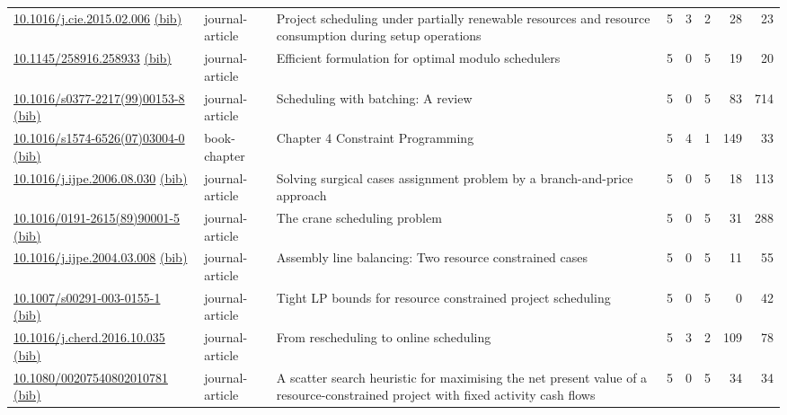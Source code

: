 {\begin{longtable}{p{5cm}lp{11cm}rrrrr}
\href{http://dx.doi.org/10.1016/j.cie.2015.02.006}{10.1016/j.cie.2015.02.006} \href{https://www.doi2bib.org/bib/10.1016/j.cie.2015.02.006}{(bib)} & journal-article & Project scheduling under partially renewable resources and resource consumption during setup operations & 5 & 3 & 2 & 28 & 23 \\
\href{http://dx.doi.org/10.1145/258916.258933}{10.1145/258916.258933} \href{https://www.doi2bib.org/bib/10.1145/258916.258933}{(bib)} & journal-article & Efficient formulation for optimal modulo schedulers & 5 & 0 & 5 & 19 & 20 \\
\href{http://dx.doi.org/10.1016/s0377-2217(99)00153-8}{10.1016/s0377-2217(99)00153-8} \href{https://www.doi2bib.org/bib/10.1016/s0377-2217(99)00153-8}{(bib)} & journal-article & Scheduling with batching: A review & 5 & 0 & 5 & 83 & 714 \\
\href{http://dx.doi.org/10.1016/s1574-6526(07)03004-0}{10.1016/s1574-6526(07)03004-0} \href{https://www.doi2bib.org/bib/10.1016/s1574-6526(07)03004-0}{(bib)} & book-chapter & Chapter 4 Constraint Programming & 5 & 4 & 1 & 149 & 33 \\
\href{http://dx.doi.org/10.1016/j.ijpe.2006.08.030}{10.1016/j.ijpe.2006.08.030} \href{https://www.doi2bib.org/bib/10.1016/j.ijpe.2006.08.030}{(bib)} & journal-article & Solving surgical cases assignment problem by a branch-and-price approach & 5 & 0 & 5 & 18 & 113 \\
\href{http://dx.doi.org/10.1016/0191-2615(89)90001-5}{10.1016/0191-2615(89)90001-5} \href{https://www.doi2bib.org/bib/10.1016/0191-2615(89)90001-5}{(bib)} & journal-article & The crane scheduling problem & 5 & 0 & 5 & 31 & 288 \\
\href{http://dx.doi.org/10.1016/j.ijpe.2004.03.008}{10.1016/j.ijpe.2004.03.008} \href{https://www.doi2bib.org/bib/10.1016/j.ijpe.2004.03.008}{(bib)} & journal-article & Assembly line balancing: Two resource constrained cases & 5 & 0 & 5 & 11 & 55 \\
\href{http://dx.doi.org/10.1007/s00291-003-0155-1}{10.1007/s00291-003-0155-1} \href{https://www.doi2bib.org/bib/10.1007/s00291-003-0155-1}{(bib)} & journal-article & Tight LP bounds for resource constrained project scheduling & 5 & 0 & 5 & 0 & 42 \\
\href{http://dx.doi.org/10.1016/j.cherd.2016.10.035}{10.1016/j.cherd.2016.10.035} \href{https://www.doi2bib.org/bib/10.1016/j.cherd.2016.10.035}{(bib)} & journal-article & From rescheduling to online scheduling & 5 & 3 & 2 & 109 & 78 \\
\href{http://dx.doi.org/10.1080/00207540802010781}{10.1080/00207540802010781} \href{https://www.doi2bib.org/bib/10.1080/00207540802010781}{(bib)} & journal-article & A scatter search heuristic for maximising the net present value of a resource-constrained project with fixed activity cash flows & 5 & 0 & 5 & 34 & 34 \\

\end{longtable}}

